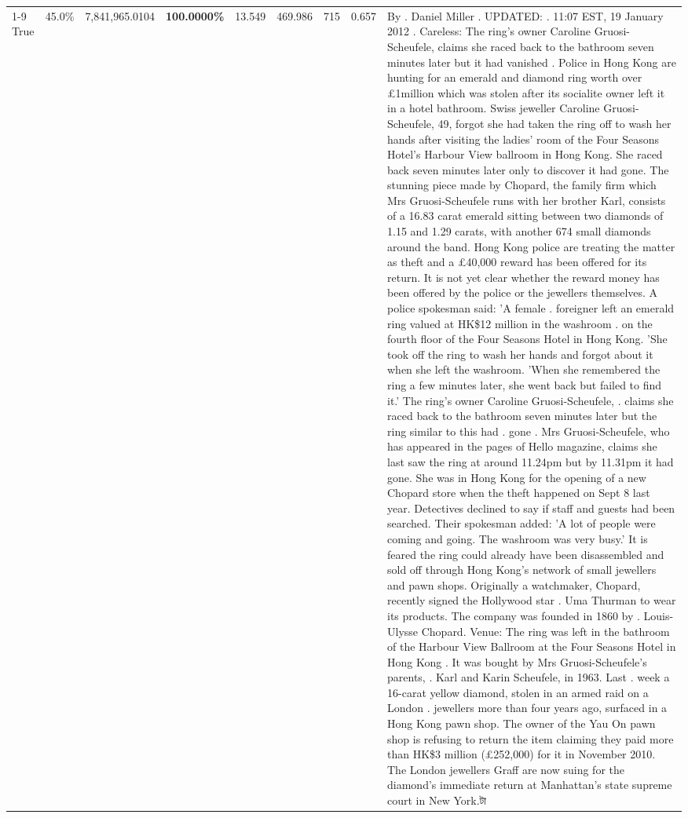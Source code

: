 \begin{table}[H]
\begin{tabular}{lllrlllll}
\cline{1-9}
True & 45.0\% & 7,841,965.0104 & \bfseries \color{red} 100.0000\% & 13.549 & 469.986 & 715 & 0.657 & By . Daniel Miller . UPDATED: . 11:07 EST, 19 January 2012 . Careless: The ring's owner Caroline Gruosi-Scheufele, claims she raced back to the bathroom seven minutes later but it had vanished . Police in Hong Kong are hunting for an emerald and diamond ring worth over £1million which was stolen after its socialite owner left it in a hotel bathroom. Swiss jeweller Caroline Gruosi-Scheufele, 49, forgot she had taken the ring off to wash her hands after visiting the ladies' room of the Four Seasons Hotel's Harbour View ballroom in Hong Kong. She raced back seven minutes later only to discover it had gone. The stunning piece made by Chopard, the family firm which Mrs Gruosi-Scheufele runs with her brother Karl, consists of a 16.83 carat emerald sitting between two diamonds of 1.15 and 1.29 carats, with another 674 small diamonds around the band. Hong Kong police are treating the matter as theft and a £40,000 reward has been offered for its return. It is not yet clear whether the reward money has been offered by the police or the jewellers themselves. A police spokesman said: 'A female . foreigner left an emerald ring valued at HK\$12 million in the washroom . on the fourth floor of the Four Seasons Hotel in Hong Kong. 'She took off the ring to wash her hands and forgot about it when she left the washroom. 'When she remembered the ring a few minutes later, she went back but failed to find it.' The ring's owner Caroline Gruosi-Scheufele, . claims she raced back to the bathroom seven minutes later but the ring similar to this had . gone . Mrs Gruosi-Scheufele, who has appeared in the pages of Hello magazine, claims she last saw the ring at around 11.24pm but by 11.31pm it had gone. She was in Hong Kong for the opening of a new Chopard store when the theft happened on Sept 8 last year. Detectives declined to say if staff and guests had been searched. Their spokesman added: 'A lot of people were coming and going. The washroom was very busy.' It is feared the ring could already have been disassembled and sold off through Hong Kong's network of small jewellers and pawn shops. Originally a watchmaker, Chopard, recently signed the Hollywood star . Uma Thurman to wear its products. The company was founded in 1860 by . Louis-Ulysse Chopard. Venue: The ring was left in the bathroom of the Harbour View Ballroom at the Four Seasons Hotel in Hong Kong . It was bought by Mrs Gruosi-Scheufele's  parents, . Karl and Karin Scheufele, in 1963. Last . week a 16-carat yellow diamond, stolen in an armed raid on a London . jewellers more than four years ago, surfaced in a Hong Kong pawn shop. The owner of the Yau On pawn shop is refusing to return the item claiming they paid more than HK\$3 million (£252,000) for it in November 2010. The London jewellers Graff are now suing for the diamond’s immediate return at Manhattan’s state supreme court in New York.টা \\

\end{tabular}
\end{table}
